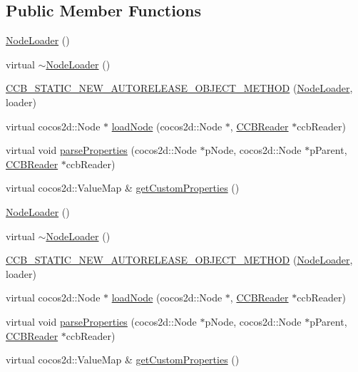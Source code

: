 \subsection*{Public Member Functions}
\begin{DoxyCompactItemize}
\item 
\hyperlink{classcocosbuilder_1_1NodeLoader_a8216017687e72740fa113b10c11ff2cb}{Node\+Loader} ()
\item 
virtual \hyperlink{classcocosbuilder_1_1NodeLoader_ac64abb2943e871fd29c8b9e1e7fb97b3}{$\sim$\+Node\+Loader} ()
\item 
\hyperlink{classcocosbuilder_1_1NodeLoader_ae9308da1634d36e5e3b720465462eb68}{C\+C\+B\+\_\+\+S\+T\+A\+T\+I\+C\+\_\+\+N\+E\+W\+\_\+\+A\+U\+T\+O\+R\+E\+L\+E\+A\+S\+E\+\_\+\+O\+B\+J\+E\+C\+T\+\_\+\+M\+E\+T\+H\+OD} (\hyperlink{classcocosbuilder_1_1NodeLoader}{Node\+Loader}, loader)
\item 
virtual cocos2d\+::\+Node $\ast$ \hyperlink{classcocosbuilder_1_1NodeLoader_ad2bd3fd5e4d405e209661827b722ef6d}{load\+Node} (cocos2d\+::\+Node $\ast$, \hyperlink{classcocosbuilder_1_1CCBReader}{C\+C\+B\+Reader} $\ast$ccb\+Reader)
\item 
virtual void \hyperlink{classcocosbuilder_1_1NodeLoader_a789d4462ae434863adb4bc9bcf50b35b}{parse\+Properties} (cocos2d\+::\+Node $\ast$p\+Node, cocos2d\+::\+Node $\ast$p\+Parent, \hyperlink{classcocosbuilder_1_1CCBReader}{C\+C\+B\+Reader} $\ast$ccb\+Reader)
\item 
virtual cocos2d\+::\+Value\+Map \& \hyperlink{classcocosbuilder_1_1NodeLoader_acbae5096e4c8b6051bf1afb146f33f9a}{get\+Custom\+Properties} ()
\item 
\hyperlink{classcocosbuilder_1_1NodeLoader_a8216017687e72740fa113b10c11ff2cb}{Node\+Loader} ()
\item 
virtual \hyperlink{classcocosbuilder_1_1NodeLoader_a627232e4d7914c692dd688b96c2e7343}{$\sim$\+Node\+Loader} ()
\item 
\hyperlink{classcocosbuilder_1_1NodeLoader_ae9308da1634d36e5e3b720465462eb68}{C\+C\+B\+\_\+\+S\+T\+A\+T\+I\+C\+\_\+\+N\+E\+W\+\_\+\+A\+U\+T\+O\+R\+E\+L\+E\+A\+S\+E\+\_\+\+O\+B\+J\+E\+C\+T\+\_\+\+M\+E\+T\+H\+OD} (\hyperlink{classcocosbuilder_1_1NodeLoader}{Node\+Loader}, loader)
\item 
virtual cocos2d\+::\+Node $\ast$ \hyperlink{classcocosbuilder_1_1NodeLoader_aa655c712059ba40f2d404268492b2794}{load\+Node} (cocos2d\+::\+Node $\ast$, \hyperlink{classcocosbuilder_1_1CCBReader}{C\+C\+B\+Reader} $\ast$ccb\+Reader)
\item 
virtual void \hyperlink{classcocosbuilder_1_1NodeLoader_a3747dfe5b2d1459673c7a6fb6d51091e}{parse\+Properties} (cocos2d\+::\+Node $\ast$p\+Node, cocos2d\+::\+Node $\ast$p\+Parent, \hyperlink{classcocosbuilder_1_1CCBReader}{C\+C\+B\+Reader} $\ast$ccb\+Reader)
\item 
virtual cocos2d\+::\+Value\+Map \& \hyperlink{classcocosbuilder_1_1NodeLoader_a3ade2a50877b9c8d806d8e056a165f46}{get\+Custom\+Properties} ()
\end{DoxyCompactItemize}

